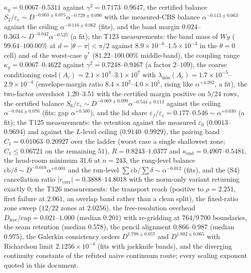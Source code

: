 \documentclass[11pt,a4paper]{article}
\begin{document}
\begin{keybox}
$\kappa_y=0.0067$--$0.5311$ against $\gamma^2=0.7173$--$0.9647$, the certified balance
$S_2/\varepsilon_c\sim D^{-0.003\pm0.075}\alpha^{-0.729\pm0.090}$ with the measured-CBS balance
$\alpha^{-0.113\pm0.063}$ against the ceiling $\alpha^{-0.116\pm0.062}$ (fits), and the band
margin $0.024$--$0.363\sim D^{-0.042}\alpha^{-0.525}$ (a fit); the T123 measurements: the
band mass of $Wy$ ($99.64$--$100.00\%$ at $d=|\theta-\pi|<\pi/2$ against
$8.9\times10^{-6}$--$1.5\times10^{-3}$ in the $\theta=0$ cell) and of the worst-case $y^*$
($81.22$--$100.00\%$ middle-band), the coupling range $\kappa_y=0.0067$--$0.4622$ against
$\gamma^2=0.7248$--$0.9467$ (a factor $2$--$109$), the coarse conditioning
$\mathrm{cond}(A_c)=2.1\times10^{4}$--$3.1\times10^{7}$ with
$\lambda_{\min}(A_c)=1.7\times10^{-5}$--$2.9\times10^{-4}$ (envelope-margin ratio
$8.4\times10^{2}$--$4.0\times10^{5}$, rising like $\alpha^{+4.202}$, a fit), the two-factor
overshoot $1.20$--$3.51$ with the certified margin positive on $5/24$ rows, the certified
balance $S_6/\varepsilon_c\sim D^{-0.069\pm0.099}\alpha^{-0.544\pm0.113}$ against the ceiling
$\alpha^{-0.044\pm0.076}$ (fits; gap $\alpha^{+0.500}$), and the lid share
$\varepsilon_f/\varepsilon_c=0.177$--$0.546\sim\alpha^{+0.030}$ (a fit); the T125 measurements: the
retention against the measured $\varepsilon_0$ ($0.0013$--$0.9694$) and against the $L$-level ceiling
($0.9140$--$0.9929$), the pairing band $C_1=0.01063$--$0.20927$ over the ladder (worst case a single
shallowest zone; $C_1\le0.06721$ on the remaining $51$), $R=0.8243$--$1.0377$ and
$\kappa_{\mathrm{end}}=0.4907$--$0.5481$, the head-room minimum $31.6$ at $n=243$, the rung-level
balance $\mathrm{cb}/\delta\sim D^{-0.010}\alpha^{+0.001}$ and the run-level
$\sum\mathrm{cb}/\sum\delta\sim\alpha^{-0.012}$ (fits), and the (S4) cancellation ratio
$|r_{\mathrm{corr}}|=0.3888$--$14.8018$ with the norm-only variant returning exactly $0$; the T126
measurements: the transport reach (positive to $\rho=2.251$, first failure at $2.061$, an overlap
band rather than a clean split), the fixed-ratio zone sweep ($12/22$ zones at $2.0256$), the
free-resolution overhead $D_{\mathrm{free}}/\mathrm{cap}=0.021$--$1.000$ (median $0.201$) with
re-gridding at $764/9\,700$ boundaries, the seam retention (median $0.578$), the pencil alignment
$0.866$--$0.987$ (median $0.975$), the Galerkin consistency orders $D^{1.798\pm0.057}$ and
$D^{1.802\pm0.065}$ with Richardson limit $2.1256\times10^{-4}$ (fits with jackknife bands), and the
diverging continuity constants of the refuted naive continuum route; every
scaling exponent quoted in this document.\\[3pt]

\end{keybox}
\end{document}
